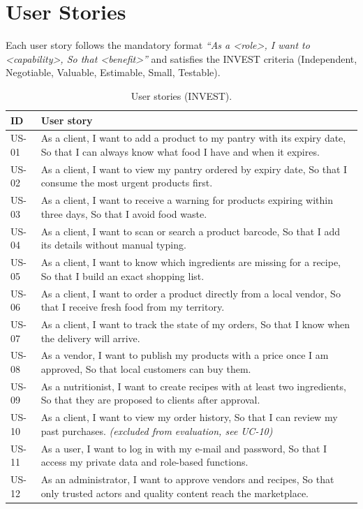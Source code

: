 \chapter{User Stories}\label{ch:stories}

Each user story follows the mandatory format
\emph{``As a \textless role\textgreater, I want to
\textless capability\textgreater, So that \textless benefit\textgreater''}
and satisfies the INVEST criteria (Independent, Negotiable, Valuable,
Estimable, Small, Testable).

\begin{table}[H]
\centering
\caption{User stories (INVEST).}
\label{tab:stories}
\begin{tabular}{@{}p{2.0cm}p{11.6cm}@{}}
\toprule
\textbf{ID} & \textbf{User story} \\
\midrule
US-01 & As a client, I want to add a product to my pantry with its expiry date,
So that I can always know what food I have and when it expires. \\
US-02 & As a client, I want to view my pantry ordered by expiry date, So that I
consume the most urgent products first. \\
US-03 & As a client, I want to receive a warning for products expiring within
three days, So that I avoid food waste. \\
US-04 & As a client, I want to scan or search a product barcode, So that I
add its details without manual typing. \\
US-05 & As a client, I want to know which ingredients are missing for a
recipe, So that I build an exact shopping list. \\
US-06 & As a client, I want to order a product directly from a local vendor,
So that I receive fresh food from my territory. \\
US-07 & As a client, I want to track the state of my orders, So that I know
when the delivery will arrive. \\
US-08 & As a vendor, I want to publish my products with a price once I am
approved, So that local customers can buy them. \\
US-09 & As a nutritionist, I want to create recipes with at least two
ingredients, So that they are proposed to clients after approval. \\
\rowcolor[gray]{0.85}
US-10 & As a client, I want to view my order history, So that I
can review my past purchases. \textit{(excluded from evaluation, see UC-10)} \\
US-11 & As a user, I want to log in with my e-mail and password, So that
I access my private data and role-based functions. \\
US-12 & As an administrator, I want to approve vendors and recipes, So that
only trusted actors and quality content reach the marketplace. \\
\bottomrule
\end{tabular}
\end{table}

